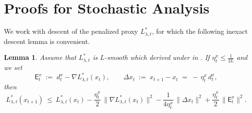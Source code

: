 \documentclass{uai2026} %
\newtheorem{lemma}{Lemma}[section]
\begin{document}
\section{Proofs for Stochastic Analysis}
We work with descent of the penalized proxy $L^{*}_{\lambda,t}$, for which the following inexact descent lemma is convenient.
\begin{lemma}
\label{lem:proxy-descent}
Assume that $L_{\lambda,t}^{*}$ is $L$-smooth which derived under  in .
If $\eta_t^x\le \tfrac{1}{2L}$ and we set
\[
\mathsf{E}_{t}^{x} \;:=\; d_t^x-\nabla L^{*}_{\lambda,t}(x_t),
\qquad
\Delta x_t \;:=\; x_{t+1}-x_t \;=\; -\,\eta_t^x\, d_t^x,
\]
then
\[
L_{\lambda,t}^{*}(x_{t+1})
~\le~ 
L_{\lambda,t}^{*}(x_t)
-\frac{\eta_t^x}{2}\,\big\|\nabla L_{\lambda,t}^{*}(x_t)\big\|^2
-\frac{1}{4\eta_t^x}\,\|\Delta x_t\|^2
+\frac{\eta_t^x}{2}\,\|\mathsf{E}_{t}^{x}\|^2 .
\]
\end{lemma}
\end{document}
